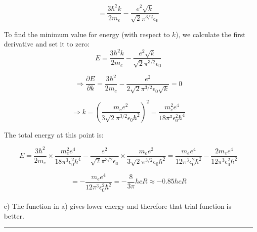 $$= \frac{3\hbar^2k}{2m_e} - \frac{e^2\sqrt{k}}{\sqrt{2}\pi^{3/2}\epsilon_0}$$

\noindent
To find the minimum value for energy (with respect to $k$), we calculate
the first derivative and set it to zero:\\

$$E = \frac{3\hbar^2k}{2m_e} - \frac{e^2\sqrt{k}}{\sqrt{2}\pi^{3/2}\epsilon_0}$$

$$\Rightarrow \frac{\partial E}{\partial k} = \frac{3\hbar^2}{2m_e}
- \frac{e^2}{2\sqrt{2}\pi^{3/2}\epsilon_0\sqrt{k}} = 0$$

$$\Rightarrow k=\left(\frac{m_ee^2}{3\sqrt{2}\pi^{3/2}\epsilon_0\hbar^2}
\right)^2 = \frac{m_e^2e^4}{18\pi^3\epsilon_0^2\hbar^4}$$

\noindent
The total energy at this point is:

$$E = \frac{3\hbar^2}{2m_e}\times\frac{m_e^2e^4}{18\pi^3\epsilon_0^2
\hbar^4} - \frac{e^2}{\sqrt{2}\pi^{3/2}\epsilon_0}\times
\frac{m_ee^2}{3\sqrt{2}\pi^{3/2}\epsilon_0\hbar^2}
= \frac{m_ee^4}{12\pi^3\epsilon_0^2\hbar^2} - \frac{2m_ee^4}
{12\pi^3\epsilon^2_0\hbar^2}$$

$$ = -\frac{m_ee^4}{12\pi^3\epsilon_0^2\hbar^2} = -\frac{8}{3\pi}hcR \approx -0.85hcR$$\\

\noindent
c) The function in a) gives lower energy and therefore that trial function
is better.\\

\hrule\vspace{0.5cm}
